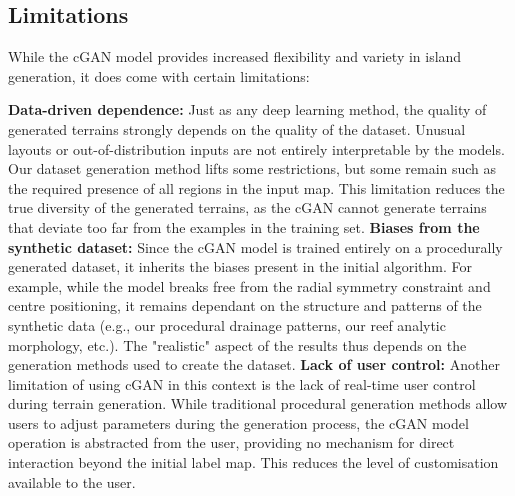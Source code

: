 \subsection{Limitations}
\label{sec:coral-island-limitations}

While the cGAN model provides increased flexibility and variety in island generation, it does come with certain limitations:

\begin{Itemize}
    \Item{} \textbf{Data-driven dependence:} Just as any deep learning method, the quality of generated terrains strongly depends on the quality of the dataset. Unusual layouts or out-of-distribution inputs are not entirely interpretable by the models. Our dataset generation method lifts some restrictions, but some remain such as the required presence of all regions in the input map. This limitation reduces the true diversity of the generated terrains, as the cGAN cannot generate terrains that deviate too far from the examples in the training set.
    \Item{} \textbf{Biases from the synthetic dataset:} Since the cGAN model is trained entirely on a procedurally generated dataset, it inherits the biases present in the initial algorithm. For example, while the model breaks free from the radial symmetry constraint and centre positioning, it remains dependant on the structure and patterns of the synthetic data (e.g., our procedural drainage patterns, our reef analytic morphology, etc.). %
    The "realistic" aspect of the results thus depends on the generation methods used to create the dataset.
    \Item{} \textbf{Lack of user control:} Another limitation of using cGAN in this context is the lack of real-time user control during terrain generation. While traditional procedural generation methods allow users to adjust parameters during the generation process, the cGAN model operation is abstracted from the user, providing no mechanism for direct interaction beyond the initial label map. This reduces the level of customisation available to the user.
\end{Itemize}

